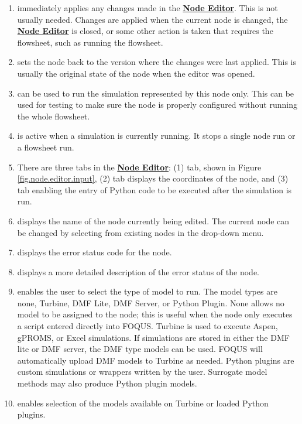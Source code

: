 \begin{enumerate}
	\item {} immediately applies any changes made in the \textbf{\underline{Node Editor}}. This is not usually needed. Changes are applied when the current node is changed, the \textbf{\underline{Node Editor}} is closed, or some other action is taken that requires the flowsheet, such as running the flowsheet.
	\item {} sets the node back to the version where the changes were last applied.  This is usually the original state of the node when the editor was opened.
	\item {} can be used to run the simulation represented by this node only.  This can be used for testing to make sure the node is properly configured without running the whole flowsheet.
	\item {} is active when a simulation is currently running. It stops a single node run or a flowsheet run.
	\item There are three tabs in the \textbf{\underline{Node Editor}}: (1)  tab, shown in Figure \ref{fig.node.editor.input}, (2)  tab displays the coordinates of the node, and (3)  tab enabling the entry of Python code to be executed after the simulation is run.
	\item {} displays the name of the node currently being edited. The current node can be changed by selecting from existing nodes in the drop-down menu.
	\item {} displays the error status code for the node.
	\item {} displays a more detailed description of the error status of the node.
	\item {} enables the user to select the type of model to run. The model types are none, Turbine, DMF Lite, DMF Server, or Python Plugin. None allows no model to be assigned to the node; this is useful when the node only executes a script entered directly into FOQUS. Turbine is used to execute Aspen, gPROMS, or Excel simulations. If simulations are stored in either the DMF lite or DMF server, the DMF type models can be used. FOQUS will automatically upload DMF models to Turbine as needed. Python plugins are custom simulations or wrappers written by the user.  Surrogate model methods may also produce Python plugin models.
	\item {} enables selection of the models available on Turbine or loaded Python plugins.

\end{enumerate}
